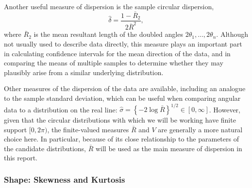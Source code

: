\documentclass[../../ArchStats.tex]{subfiles}
\begin{document}
Another useful measure of dispersion is the sample circular dispersion,
\[\hat{\delta} = \frac{1-\bar{R}_2}{2\bar{R}^2},\]
where $\bar{R}_2$ is the mean resultant length of the doubled angles $2\theta_1, \dots, 2\theta_n$. Although not usually used to describe data directly, this measure plays an important part in calculating confidence intervals for the mean direction of the data, and in comparing the means of multiple samples to determine whether they may plausibly arise from a similar underlying distribution. 

Other measures of the dispersion of the data are available, including an analogue to the  sample standard deviation, which can be useful when comparing angular data to a distribution on the real line: $\hat{\sigma} = \left\lbrace -2 \log \bar{R} \right\rbrace ^{1/2} \in [0, \infty]$. However, given that the circular distributions with which we will be working have finite support $[0, 2\pi)$, the finite-valued measures $\bar{R}$ and $V$ are generally a more natural choice here. In particular, because of its close relationship to the parameters of the candidate distributions, $\bar{R}$ will be used as the main measure of dispersion in this report.
 



\subsubsection{Shape: Skewness and Kurtosis}

\end{document}

